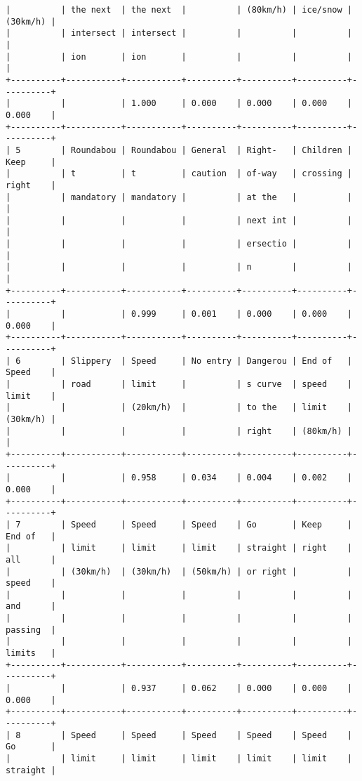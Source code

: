\documentclass[11pt]{article}
\begin{document}
\begin{Verbatim}[commandchars=\\\{\}]
|          | the next  | the next  |          | (80km/h) | ice/snow | (30km/h) |
|          | intersect | intersect |          |          |          |          |
|          | ion       | ion       |          |          |          |          |
+----------+-----------+-----------+----------+----------+----------+----------+
|          |           | 1.000     | 0.000    | 0.000    | 0.000    | 0.000    |
+----------+-----------+-----------+----------+----------+----------+----------+
| 5        | Roundabou | Roundabou | General  | Right-   | Children | Keep     |
|          | t         | t         | caution  | of-way   | crossing | right    |
|          | mandatory | mandatory |          | at the   |          |          |
|          |           |           |          | next int |          |          |
|          |           |           |          | ersectio |          |          |
|          |           |           |          | n        |          |          |
+----------+-----------+-----------+----------+----------+----------+----------+
|          |           | 0.999     | 0.001    | 0.000    | 0.000    | 0.000    |
+----------+-----------+-----------+----------+----------+----------+----------+
| 6        | Slippery  | Speed     | No entry | Dangerou | End of   | Speed    |
|          | road      | limit     |          | s curve  | speed    | limit    |
|          |           | (20km/h)  |          | to the   | limit    | (30km/h) |
|          |           |           |          | right    | (80km/h) |          |
+----------+-----------+-----------+----------+----------+----------+----------+
|          |           | 0.958     | 0.034    | 0.004    | 0.002    | 0.000    |
+----------+-----------+-----------+----------+----------+----------+----------+
| 7        | Speed     | Speed     | Speed    | Go       | Keep     | End of   |
|          | limit     | limit     | limit    | straight | right    | all      |
|          | (30km/h)  | (30km/h)  | (50km/h) | or right |          | speed    |
|          |           |           |          |          |          | and      |
|          |           |           |          |          |          | passing  |
|          |           |           |          |          |          | limits   |
+----------+-----------+-----------+----------+----------+----------+----------+
|          |           | 0.937     | 0.062    | 0.000    | 0.000    | 0.000    |
+----------+-----------+-----------+----------+----------+----------+----------+
| 8        | Speed     | Speed     | Speed    | Speed    | Speed    | Go       |
|          | limit     | limit     | limit    | limit    | limit    | straight |

\end{Verbatim}
\end{document}
